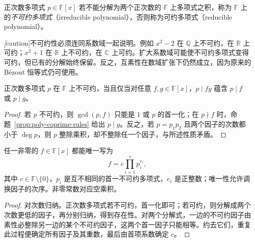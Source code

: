 \begin{definition}
\label{def:poly-irreducible}
正次数多项式 $p\in\mathbb F[x]$ 若不能分解为两个正次数的 $\mathbb F$ 上多项式之积，称为 $\mathbb F$ 上的\emph{不可约多项式}（irreducible polynomial），否则称为可约多项式（reducible polynomial）。
\end{definition}

\emph[caution]{不可约性必须连同系数域一起说明}。例如 $x^2-2$ 在 $\mathbb Q$ 上不可约，在 $\mathbb R$ 上可约；$x^2+1$ 在 $\mathbb R$ 上不可约，在 $\mathbb C$ 上可约。扩大系数域可能使不可约多项式变得可约，但已有的分解始终保留。反之，互素性在数域扩张下仍然成立，因为原来的 Bézout 恒等式仍可使用。

\begin{theorem}[不可约多项式的素性]
\label{thm:poly-prime}
正次数多项式 $p$ 在 $\mathbb F$ 上不可约，当且仅当对任意 $f,g\in\mathbb F[x]$，$p\mid fg$ 蕴含 $p\mid f$ 或 $p\mid g$。
\end{theorem}
\begin{proof}
若 $p$ 不可约，则 $\gcd(p,f)$ 只能是 $1$ 或 $p$ 的首一化；在 $p\nmid f$ 时，命题~\ref{prop:poly-coprime-rules} 给出 $p\mid g$。反之，若 $p=p_1p_2$ 且两个因子的次数都小于 $\deg p$，则 $p$ 整除乘积，却不整除任一个因子，与所述性质矛盾。
\end{proof}

\begin{theorem}[唯一因式分解]
\label{thm:poly-unique-factorization}
任一非零的 $f\in\mathbb F[x]$ 都能唯一写为
\begin{equation}
\label{eq:poly-standard-factorization}
    f=c\prod_{i=1}^s p_i^{e_i},
\end{equation}
其中 $c\in\mathbb F\setminus\{0\}$，$p_i$ 是互不相同的首一不可约多项式，$e_i$ 是正整数；唯一性允许调换因子的次序。非零常数对应空乘积。
\end{theorem}
\begin{proof}
对次数归纳。正次数多项式若不可约，首一化即可；若可约，则分解成两个次数更低的因子，再分别归纳，得到存在性。对两个分解式，一边的不可约因子由素性必整除另一边的某个不可约因子，这两个首一因子只能相等。约去它们，重复此过程便确定所有因子及其重数，最后由首项系数确定 $c$。
\end{proof}

